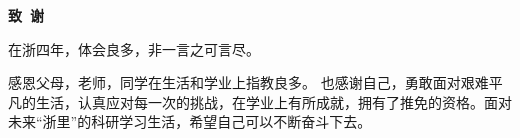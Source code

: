 \cleardoublepage{}
\begin{center}
    \bfseries {} 致~谢 \\
    

\end{center}

    \par 在浙四年，体会良多，非一言之可言尽。

    \par 感恩父母，老师，同学在生活和学业上指教良多。 也感谢自己，勇敢面对艰难平凡的生活，认真应对每一次的挑战，在学业上有所成就，拥有了推免的资格。面对未来“浙里”的科研学习生活，希望自己可以不断奋斗下去。